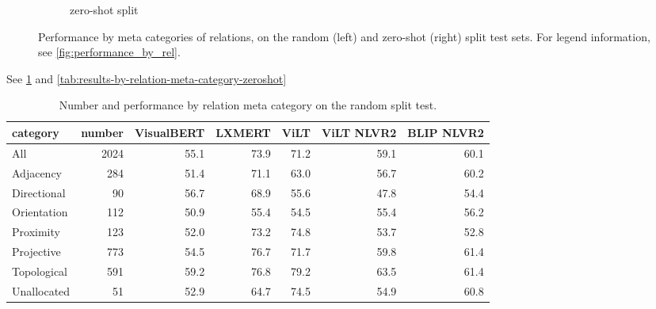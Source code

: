 \begin{figure}[ht]
\begin{subfigure}[b]{0.49\linewidth}
         \caption{zero-shot split}
     \end{subfigure}
\caption{Performance by meta categories of relations, on the random (left) and zero-shot (right) split test sets. For legend information, see \cref{fig:performance_by_rel}.}
    \label{fig:performance_by_meta_cat}
\end{figure}

See \cref{tab:results-by-relation-meta-category-random} and \cref{tab:results-by-relation-meta-category-zeroshot}

\begin{table}[ht]
\centering
\begin{tabular}{lrrrrrr}
\toprule
category &  number &  VisualBERT &  LXMERT &  ViLT &  ViLT NLVR2 &  BLIP NLVR2 \\
\midrule
All         &    2024 &        55.1 &    73.9 &  71.2 &        59.1 &        60.1 \\
\midrule
Adjacency   &     284 &        51.4 &    71.1 &  63.0 &        56.7 &        60.2 \\
Directional &      90 &        56.7 &    68.9 &  55.6 &        47.8 &        54.4 \\
Orientation &     112 &        50.9 &    55.4 &  54.5 &        55.4 &        56.2 \\
Proximity   &     123 &        52.0 &    73.2 &  74.8 &        53.7 &        52.8 \\
Projective  &     773 &        54.5 &    76.7 &  71.7 &        59.8 &        61.4 \\
Topological &     591 &        59.2 &    76.8 &  79.2 &        63.5 &        61.4 \\
Unallocated &      51 &        52.9 &    64.7 &  74.5 &        54.9 &        60.8 \\
\bottomrule
\end{tabular}
\caption{Number and performance by relation meta category on the random split test.}
\label{tab:results-by-relation-meta-category-random}
\end{table}

